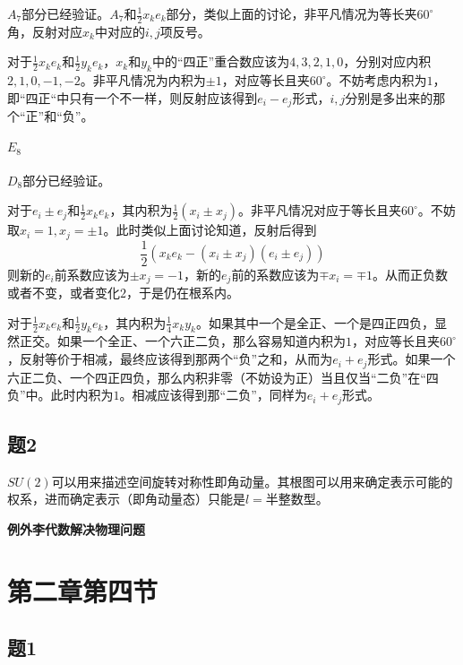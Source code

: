 \documentclass{ctexart}
\begin{document}
	$A_7$部分已经验证。$A_7$和$\frac{1}{2}x_ke_k$部分，类似上面的讨论，非平凡情况为等长夹$60^\circ$角，反射对应$x_k$中对应的$i,j$项反号。
	
	对于$\frac{1}{2}x_ke_k$和$\frac{1}{2}y_ke_k$，$x_k$和$y_k$中的“四正”重合数应该为$4,3,2,1,0$，分别对应内积$2,1,0,-1,-2$。非平凡情况为内积为$\pm 1$，对应等长且夹$60^\circ$。不妨考虑内积为$1$，即“四正“中只有一个不一样，则反射应该得到$e_i-e_j$形式，$i,j$分别是多出来的那个“正”和“负”。
	
	\paragraph{$E_8$}
	
	$D_8$部分已经验证。
	
	对于$e_i\pm e_j$和$\frac{1}{2}x_ke_k$，其内积为$\frac{1}{2}(x_i\pm x_j)$。非平凡情况对应于等长且夹$60^\circ$。不妨取$x_i=1,x_j=\pm 1$。此时类似上面讨论知道，反射后得到
	\begin{equation}
	\frac{1}{2}(x_ke_k-(x_i\pm x_j)(e_i\pm e_j))
	\end{equation}
	则新的$e_i$前系数应该为$\pm x_j=-1$，新的$e_j$前的系数应该为$\mp x_i=\mp 1$。从而正负数或者不变，或者变化$2$，于是仍在根系内。
	
	对于$\frac{1}{2}x_ke_k$和$\frac{1}{2}y_ke_k$，其内积为$\frac{1}{4}x_ky_k$。如果其中一个是全正、一个是四正四负，显然正交。如果一个全正、一个六正二负，那么容易知道内积为$1$，对应等长且夹$60^\circ$，反射等价于相减，最终应该得到那两个“负”之和，从而为$e_i+e_j$形式。如果一个六正二负、一个四正四负，那么内积非零（不妨设为正）当且仅当“二负”在“四负”中。此时内积为$1$。相减应该得到那“二负”，同样为$e_i+e_j$形式。
	
	\subsection{题2}
	
	$SU(2)$可以用来描述空间旋转对称性即角动量。其根图可以用来确定表示可能的权系，进而确定表示（即角动量态）只能是$l=$半整数型。
	
	\textbf{例外李代数解决物理问题}
	
	\section{第二章第四节}
	
	\subsection{题1}
	
\end{document}
